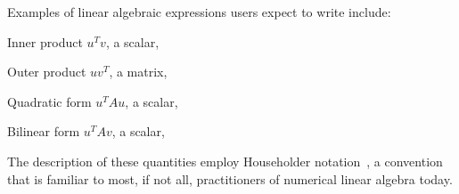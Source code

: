 Examples of linear algebraic expressions users expect to write include:

\begin{description}

\item{Inner product} $u^T v$, a scalar,
\item{Outer product} $u v^T$, a matrix,
\item{Quadratic form} $u^T A u$, a scalar,
\item{Bilinear form} $u^T A v$, a scalar,

\end{description}

The description of these quantities employ Householder notation~\cite{Householder1953,Householder1955}, a convention that is familiar to most, if not all, practitioners of numerical linear algebra today.